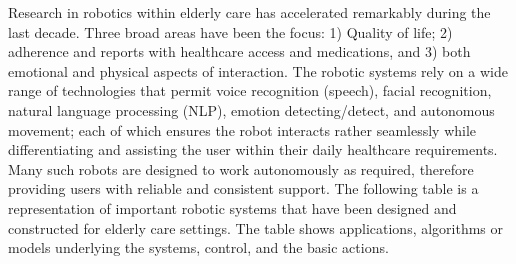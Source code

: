 Research in robotics within elderly care has accelerated remarkably during the last decade. Three broad areas have been the focus: 1) Quality of life; 2) adherence and reports with healthcare access and medications, and 3) both emotional and physical aspects of interaction. The robotic systems rely on a wide range of technologies that permit voice recognition (speech), facial recognition, natural language processing (NLP), emotion detecting/detect, and autonomous movement; each of which ensures the robot interacts rather seamlessly while differentiating and assisting the user within their daily healthcare requirements. Many such robots are designed to work autonomously as required, therefore providing users with reliable and consistent support. The following table is a representation of important robotic systems that have been designed and constructed for elderly care settings. The table shows applications, algorithms or models underlying the systems, control, and the basic actions.

